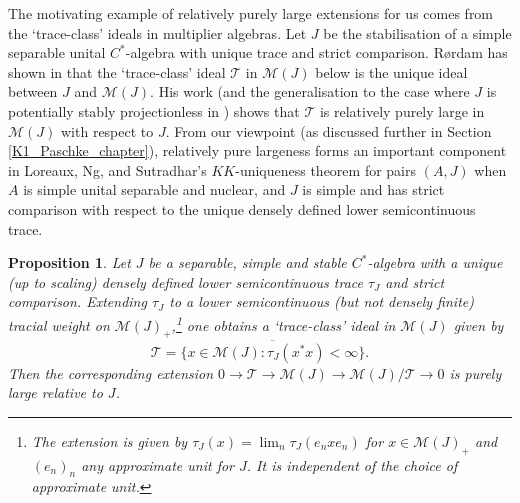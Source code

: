 \documentclass[reqno]{amsart}
\newtheorem{prop}[thm]{Proposition}
\theoremstyle{definition}
\theoremstyle{remark}
\numberwithin{equation}{section}
\theoremstyle{definition}
\newcommand{\calM}{\mathcal{M}}
\newcommand{\calT}{\mathcal{T}}
\begin{document}
The motivating example of relatively purely large extensions for us comes from the `trace-class' ideals in multiplier algebras.  Let $J$ be the stabilisation of a simple separable unital $C^*$-algebra with unique trace and strict comparison. R\o{}rdam has shown in \cite{ideals_multiplier_finite} that the `trace-class' ideal $\mathcal T$ in $\mathcal M(J)$ below is the unique ideal between $J$ and $\calM(J)$. His work (and the generalisation to the case where $J$ is potentially stably projectionless in \cite{multiplier_strict_comparison}) shows that $\mathcal T$ is relatively purely large in $\mathcal M(J)$ with respect to $J$.  From our viewpoint (as discussed further in Section \ref{K1_Paschke_chapter}), relatively pure largeness forms an important component in Loreaux, Ng, and Sutradhar's $KK$-uniqueness theorem for pairs $(A,J)$ when $A$ is simple unital separable and nuclear, and $J$ is simple and has strict comparison with respect to the unique densely defined lower semicontinuous trace. 

\begin{prop} 
\label{unique_trace_PL} 
Let $J$ be a separable, simple and stable $C^*$-algebra with a unique (up to scaling) densely defined lower semicontinuous trace $\tau_J$  and strict comparison. Extending $\tau_J$ to a lower semicontinuous (but not densely finite) tracial weight on $\calM(J)_+$,\footnote{The extension is given by $\tau_J(x)=\lim_n\tau_J(e_nxe_n)$ for $x\in\mathcal M(J)_+$ and $(e_n)_n$ any approximate unit for $J$. It is independent of the choice of approximate unit.} one obtains a `trace-class' ideal in $\calM(J)$ given by 
\begin{equation} \label{unique_trace_PL:1}
\calT = \overline{\{x\in \calM(J): \tau_{J}(x^{\ast}x) < \infty\}}.
\end{equation} 
Then the corresponding extension $0\to \calT\to \calM(J)\to \calM(J)/\calT\to 0$ is purely large relative to $J$. 
\end{prop} 
\end{document}
